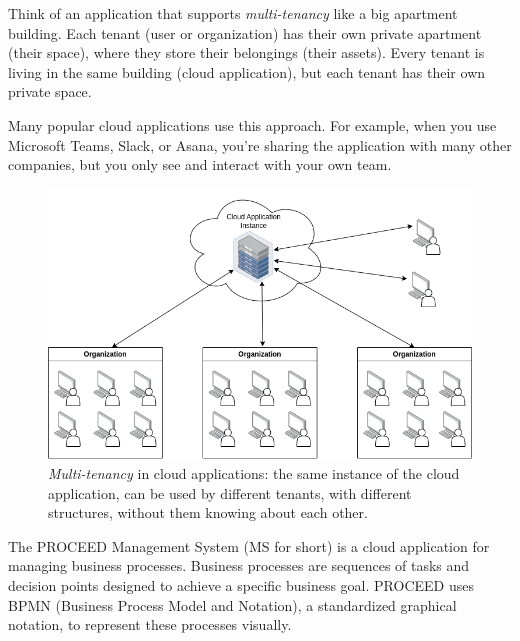 
Think of an application that supports \textit{multi-tenancy} like a big apartment building.
Each tenant (user or organization) has their
own private apartment (their space), where they store their belongings (their assets).
Every tenant is living in the same building (cloud application), but each tenant has their
own private space.

Many popular cloud applications use this approach. For example, when you use Microsoft Teams,
Slack, or Asana, you're sharing the application with many other companies, but you only
see and interact with your own team.

\begin{figure}[H]
	\centering
	\includegraphics[scale=0.45]{images/mt-cloud-services.png}
	\caption{\textit{Multi-tenancy} in cloud applications: the same instance of the cloud
		application, can be used by different tenants, with different structures, without them knowing about each other.}
	\label{fig:multi-tenant=cloud-applications}
\end{figure}
\FloatBarrier

The PROCEED Management System (MS for short) is a cloud application for managing business
processes.
Business processes are sequences of tasks and decision points designed to achieve a specific
business goal.
PROCEED uses BPMN (Business Process Model and Notation), a standardized
graphical notation, to represent these processes visually.


